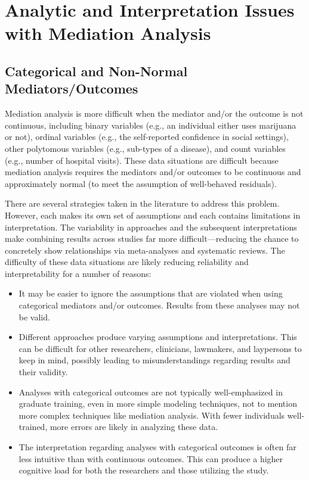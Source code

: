 \documentclass[]{DissertateUSU}
\providecommand{\tightlist}{%
  \setlength{\itemsep}{0pt}\setlength{\parskip}{0pt}}
\begin{document}
\section{Analytic and Interpretation Issues with Mediation
Analysis}\label{analytic-and-interpretation-issues-with-mediation-analysis}

\subsection{Categorical and Non-Normal
Mediators/Outcomes}\label{categorical-and-non-normal-mediatorsoutcomes}

Mediation analysis is more difficult when the mediator and/or the
outcome is not continuous, including binary variables (e.g., an
individual either uses marijuana or not), ordinal variables (e.g., the
self-reported confidence in social settings), other polytomous variables
(e.g., sub-types of a disease), and count variables (e.g., number of
hospital visits). These data situations are difficult because mediation
analysis requires the mediators and/or outcomes to be continuous and
approximately normal (to meet the assumption of well-behaved residuals).

There are several strategies taken in the literature to address this
problem. However, each makes its own set of assumptions and each
contains limitations in interpretation. The variability in approaches
and the subsequent interpretations make combining results across studies
far more difficult---reducing the chance to concretely show
relationships via meta-analyses and systematic reviews. The difficulty
of these data situations are likely reducing reliability and
interpretability for a number of reasons:

\begin{itemize}
\tightlist
\item
  It may be easier to ignore the assumptions that are violated when
  using categorical mediators and/or outcomes. Results from these
  analyses may not be valid.
\item
  Different approaches produce varying assumptions and interpretations.
  This can be difficult for other researchers, clinicians, lawmakers,
  and laypersons to keep in mind, possibly leading to misunderstandings
  regarding results and their validity.
\item
  Analyses with categorical outcomes are not typically well-emphasized
  in graduate training, even in more simple modeling techniques, not to
  mention more complex techniques like mediation analysis. With fewer
  individuals well-trained, more errors are likely in analyzing these
  data.
\item
  The interpretation regarding analyses with categorical outcomes is
  often far less intuitive than with continuous outcomes. This can
  produce a higher cognitive load for both the researchers and those
  utilizing the study.
\end{itemize}
\end{document}
